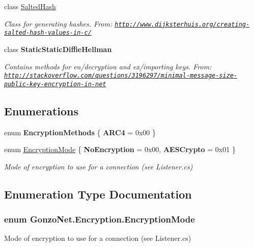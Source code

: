 \begin{DoxyCompactItemize}
class \hyperlink{class_gonzo_net_1_1_encryption_1_1_salted_hash}{Salted\+Hash}
\begin{DoxyCompactList}\small\item\em Class for generating hashes. From\+: \href{http://www.dijksterhuis.org/creating-salted-hash-values-in-c/}{\tt http\+://www.\+dijksterhuis.\+org/creating-\/salted-\/hash-\/values-\/in-\/c/} \end{DoxyCompactList}\item 
class {\bfseries Static\+Static\+Diffie\+Hellman}
\begin{DoxyCompactList}\small\item\em Contains methods for en/decryption and ex/importing keys. From\+: \href{http://stackoverflow.com/questions/3196297/minimal-message-size-public-key-encryption-in-net}{\tt http\+://stackoverflow.\+com/questions/3196297/minimal-\/message-\/size-\/public-\/key-\/encryption-\/in-\/net} \end{DoxyCompactList}\end{DoxyCompactItemize}
\subsection*{Enumerations}
\begin{DoxyCompactItemize}
\item 
\hypertarget{namespace_gonzo_net_1_1_encryption_aa5f569f0732b0b40f122d0aac647e4cd}{enum {\bfseries Encryption\+Methods} \{ {\bfseries A\+R\+C4} = 0x00
 \}}\label{namespace_gonzo_net_1_1_encryption_aa5f569f0732b0b40f122d0aac647e4cd}

\item 
enum \hyperlink{namespace_gonzo_net_1_1_encryption_af0c5afc1c3ebbb6e3798067325cc50b9}{Encryption\+Mode} \{ {\bfseries No\+Encryption} = 0x00, 
{\bfseries A\+E\+S\+Crypto} = 0x01
 \}
\begin{DoxyCompactList}\small\item\em Mode of encryption to use for a connection (see Listener.\+cs) \end{DoxyCompactList}\end{DoxyCompactItemize}


\subsection{Enumeration Type Documentation}
\hypertarget{namespace_gonzo_net_1_1_encryption_af0c5afc1c3ebbb6e3798067325cc50b9}{
\subsubsection[{Encryption\+Mode}]{\setlength{\rightskip}{0pt plus 5cm}enum {\bf Gonzo\+Net.\+Encryption.\+Encryption\+Mode}}}\label{namespace_gonzo_net_1_1_encryption_af0c5afc1c3ebbb6e3798067325cc50b9}


Mode of encryption to use for a connection (see Listener.\+cs) 

